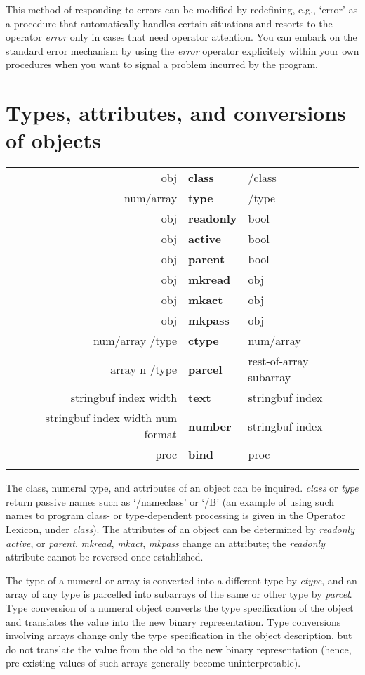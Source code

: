 This method of responding to errors can be modified by redefining, e.g., `error' as a procedure that automatically handles certain situations and resorts  to the operator \emph{error} only in cases that need operator attention. You can embark on the standard error mechanism by using the \emph{error} operator explicitely within your own procedures when you want to signal a problem incurred by the program.

\section{Types, attributes, and conversions of objects}

\begin{tabular}{>{\sffamily}r>{\sffamily\bfseries}l>{\sffamily}l}
obj & class & /class\\
num/array & type & /type\\
obj & readonly & bool\\
obj & active & bool\\
obj & parent & bool\\
obj & mkread & obj\\
obj & mkact & obj\\
obj & mkpass & obj\\
num/array /type & ctype & num/array\\
array n /type & parcel & rest-of-array subarray\\
stringbuf index width & text & stringbuf index\\
stringbuf index width num format & number & stringbuf index\\
proc & bind & proc\\\\
\end{tabular}

The  class,  numeral type,  and attributes of an object can be  inquired. 
\emph{class} or  \emph{type} return passive names such as  `/nameclass'  or  `/B'  (an example of using such names to program class- or type-dependent processing is given in the Operator Lexicon, under \emph{class}). The attributes of an object  can  be  determined  by \emph{readonly} \emph{active},  or \emph{parent}.  \emph{mkread}, \emph{mkact}, \emph{mkpass} change an attribute; the \emph{readonly} attribute cannot be reversed once established.

The  type  of  a  numeral or array is converted  into  a  different  type by \emph{ctype},  and an array of any type is parcelled into subarrays of the same or other type by \emph{parcel}.  Type conversion of a numeral object converts  the type  specification  of the object and translates the value into  the  new binary representation.  Type conversions involving arrays change only  the type  specification in the object description,  but do not  translate  the value from the old to the new binary representation  (hence,  pre-existing values of such arrays generally become uninterpretable).

